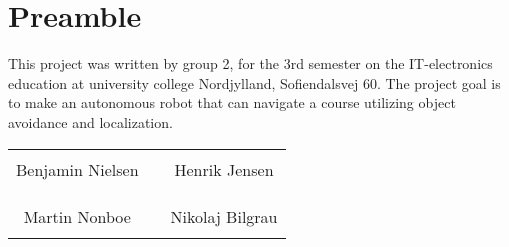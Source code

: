 \chapter*{Preamble}


This project was written by group 2, for the 3rd semester on the IT-electronics education at university college Nordjylland, Sofiendalsvej 60. The project goal is to make an autonomous robot that can navigate a course utilizing object avoidance and localization.
%
\phantom{Luft}\vspace{3cm}
\begin{table}[H]
	\centering
		\begin{tabular}{c c c}
			\underline{\phantom{JAERJAERJAERJAERGO}} & \phantom{cookies} & \underline{\phantom{JAERJAERJAERJAERGO}} \\
			Benjamin Nielsen			& \phantom{cookies} & Henrik Jensen		\\
			&&\\
			&&\\
			\underline{\phantom{JAERJAERJAERJAERGO}} & \phantom{cookies} & \underline{\phantom{JAERJAERJAERJAERGO}} \\
			Martin Nonboe			& \phantom{cookies} & Nikolaj Bilgrau		\\
			&&\\
						
		\end{tabular}
\end{table}